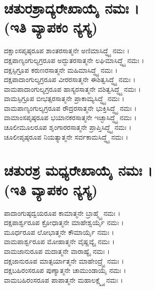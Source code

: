 \section{ಚತುರಶ್ರಾದ್ಯರೇಖಾಯೈ ನಮಃ ।\\ (ಇತಿ ವ್ಯಾಪಕಂ ನ್ಯಸ್ಯ)}
ದಕ್ಷಾಂಸಪೃಷ್ಠರೂಪ ಶಾಂತರಸಾತ್ಮನೇ ಅಣಿಮಾಸಿದ್ಧ್ಯೈ ನಮಃ ।\\
ದಕ್ಷಪಾಣ್ಯಂಗುಲ್ಯಗ್ರರೂಪ ಅದ್ಭುತರಸಾತ್ಮನೇ ಲಘಿಮಾಸಿದ್ಧ್ಯೈ ನಮಃ ।\\
ದಕ್ಷಸ್ಫಿಗ್ರೂಪ ಕರುಣರಸಾತ್ಮನೇ ಮಹಿಮಾಸಿದ್ಧ್ಯೈ ನಮಃ ।\\
ದಕ್ಷಪಾದಾಂಗುಲ್ಯಗ್ರರೂಪ ವೀರರಸಾತ್ಮನೇ ಈಶಿತ್ವಸಿದ್ಧ್ಯೈ ನಮಃ ।\\
ವಾಮಪಾದಾಂಗುಲ್ಯಗ್ರರೂಪ ಹಾಸ್ಯರಸಾತ್ಮನೇ ವಶಿತ್ವಸಿದ್ಧ್ಯೈ ನಮಃ ।\\
ವಾಮಸ್ಫಿಗ್ರೂಪ ಬೀಭತ್ಸರಸಾತ್ಮನೇ ಪ್ರಾಕಾಮ್ಯಸಿದ್ಧ್ಯೈ ನಮಃ ।\\
ವಾಮಪಾಣ್ಯಂಗುಲ್ಯಗ್ರರೂಪ ರೌದ್ರರಸಾತ್ಮನೇ ಭುಕ್ತಿಸಿದ್ಧ್ಯೈ ನಮಃ ।\\
ವಾಮಾಂಸಪೃಷ್ಠರೂಪ ಭಯಾನಕರಸಾತ್ಮನೇ ಇಚ್ಛಾಸಿದ್ಧ್ಯೈ ನಮಃ ।\\
ಚೂಲೀಮೂಲರೂಪ ಶೃಂಗಾರರಸಾತ್ಮನೇ ಪ್ರಾಪ್ತಿಸಿದ್ಧ್ಯೈ ನಮಃ ।\\
ಚೂಲೀಪೃಷ್ಠರೂಪ ನಿಯತ್ಯಾತ್ಮನೇ ಸರ್ವಕಾಮಸಿದ್ಧ್ಯೈ ನಮಃ ।

\section{ಚತುರಶ್ರ ಮಧ್ಯರೇಖಾಯೈ ನಮಃ ।\\ (ಇತಿ ವ್ಯಾಪಕಂ ನ್ಯಸ್ಯ)}
ಪಾದಾಂಗುಷ್ಠದ್ವಯರೂಪ ಕಾಮಾತ್ಮನೇ ಬ್ರಾಹ್ಮ್ಯೈ ನಮಃ ।\\
ದಕ್ಷಪಾರ್ಶ್ವರೂಪ ಕ್ರೋಧಾತ್ಮನೇ ಮಾಹೇಶ್ವರ್ಯೈ ನಮಃ ।\\
ಮೂರ್ಧರೂಪ ಲೋಭಾತ್ಮನೇ ಕೌಮಾರ್ಯೈ ನಮಃ ।\\
ವಾಮಪಾರ್ಶ್ವರೂಪ ಮೋಹಾತ್ಮನೇ ವೈಷ್ಣವ್ಯೈ ನಮಃ ।\\
ವಾಮಜಾನುರೂಪ ಮದಾತ್ಮನೇ ವಾರಾಹ್ಯೈ ನಮಃ ।\\
ದಕ್ಷಜಾನುರೂಪ ಮಾತ್ಸರ್ಯಾತ್ಮನೇ ಮಾಹೇಂದ್ರ್ಯೈ ನಮಃ ।\\
ದಕ್ಷಬಹಿರಂಸರೂಪ ಪುಣ್ಯಾತ್ಮನೇ ಚಾಮುಂಡಾಯೈ ನಮಃ ।\\
ವಾಮಬಹಿರಂಸರೂಪ ಪಾಪಾತ್ಮನೇ ಮಹಾಲಕ್ಷ್ಮ್ಯೈ ನಮಃ ।

